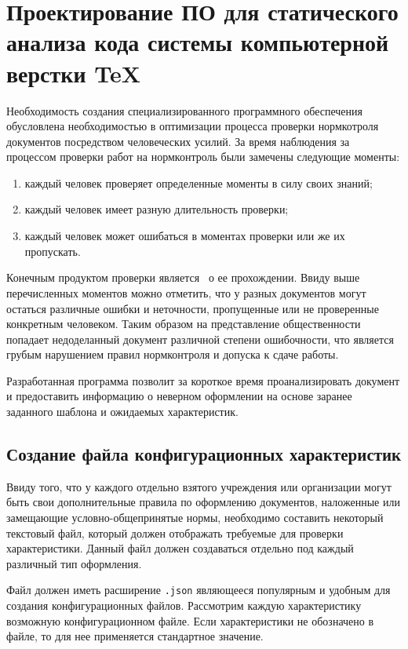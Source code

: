 \chapter{Проектирование ПО для статического анализа кода системы компьютерной верстки TeX}

Необходимость создания специализированного программного обеспечения обусловлена необходимостью в оптимизации процесса проверки нормкотроля документов посредством человеческих усилий. За время наблюдения за процессом проверки работ на нормконтроль были замечены следующие моменты:

\begin{enumerate}
    \item каждый человек проверяет определенные моменты в силу своих знаний;
    \item каждый человек имеет разную длительность проверки;
    \item каждый человек может ошибаться в моментах проверки или же их пропускать.
\end{enumerate}

Конечным продуктом проверки является \guillemotright\verb| |о ее прохождении. Ввиду выше перечисленных моментов можно отметить, что у разных документов могут остаться различные ошибки и неточности, пропущенные или не проверенные конкретным человеком. Таким образом на представление общественности попадает недоделанный документ различной степени ошибочности, что является грубым нарушением правил нормконтроля и допуска к сдаче работы.

Разработанная программа позволит за короткое время проанализировать документ и предоставить информацию о неверном оформлении на основе заранее заданного шаблона и ожидаемых характеристик.

\section{Создание файла конфигурационных характеристик}

Ввиду того, что у каждого отдельно взятого учреждения или организации могут быть свои дополнительные правила по оформлению документов, наложенные или замещающие условно-общепринятые нормы, необходимо составить некоторый текстовый файл, который должен отображать требуемые для проверки характеристики. Данный файл должен создаваться отдельно под каждый различный тип оформления.

Файл должен иметь расширение \verb|.json| являющееся популярным и удобным для создания конфигурационных файлов. Рассмотрим каждую характеристику возможную конфигурационном файле. Если характеристики не обозначено в файле, то для нее применяется стандартное значение.

